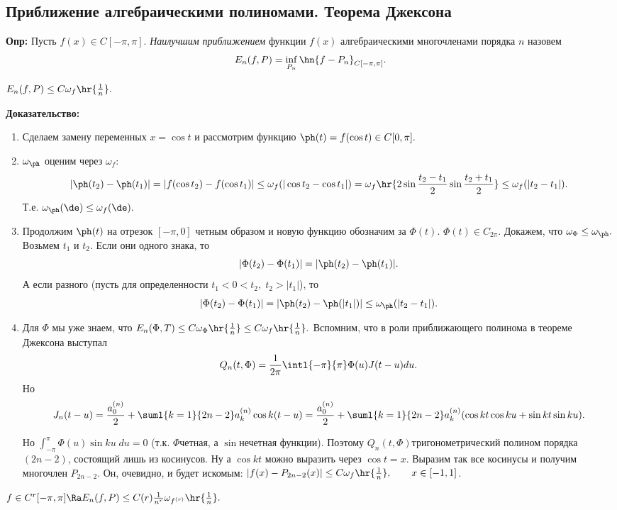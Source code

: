 \documentclass[a4paper]{article}
\begin{document}
\subsection{Приближение алгебраическими полиномами. Теорема Джексона}
\textbf{Опр:} Пусть $f(x)\in C[-\pi,\pi]$. \emph{Наилучшим
приближением} функции $f(x)$ алгебраическими многочленами порядка
$n$ назовем
$$E_n(f,P)=\inf_{P_n}\hn{f-P_n}_{C[-\pi,\pi]}.$$

\begin{theorems}[Джексон] $E_n(f,P)\le
C\omega_f\hr{\frac1n}.$
\end{theorems}
\textbf{Доказательство:}
\begin{enumerate}
\item
Сделаем замену переменных $x=\cos t$ и рассмотрим функцию
$\ph(t)=f(\cos t)\in C[0,\pi].$
\item
$\omega_{\ph}$ оценим через $\omega_f$:
\begin{equation*}
|\ph(t_2)-\ph(t_1)|=|f(\cos t_2)-f(\cos t_1)|\le\omega_f(|\cos
t_2-\cos
t_1|)=\omega_f\hr{2\sin\frac{t_2-t_1}2\sin\frac{t_2+t_1}2}\le\omega_f(|t_2-t_1|).
\end{equation*}
Т.е. $\omega_{\ph}(\de)\le\omega_f(\de).$
\item
Продолжим $\ph(t)$ на отрезок $[-\pi,0]$ четным образом и новую
функцию обозначим за $\Phi(t).$ $\Phi(t)\in C_{2\pi}$. Докажем,
что $\omega_{\Phi}\le\omega_{\ph}.$ Возьмем $t_1$ и $t_2$. Если
они одного знака, то
$$|\Phi(t_2)-\Phi(t_1)|=|\ph(t_2)-\ph(t_1)|.$$ А если разного
(пусть для определенности $t_1<0<t_2,\; t_2>|t_1|$), то
$$|\Phi(t_2)-\Phi(t_1)|=|\ph(t_2)-\ph(|t_1|)|\le\omega_{\ph}(|t_2-t_1|).$$
\item
Для $\Phi$ мы уже знаем, что $E_n(\Phi,T)\le
C\omega_{\Phi}\hr{\frac1n}\le
C\omega_f\hr{\frac1n}.$ Вспомним, что в роли приближающего
полинома в теореме Джексона выступал
\begin{equation*}
Q_n(t,\Phi)=\frac1{2\pi}\intl{-\pi}{\pi}\Phi(u)J(t-u)du.
\end{equation*}
Но
\begin{equation*}
J_n(t-u)=\frac{a_0^{(n)}}2+\suml{k=1}{2n-2} a_k^{(n)}\cos
k(t-u)=\frac{a_0^{(n)}}2+\suml{k=1}{2n-2} a_k^{(n)}(\cos
kt\cos ku+\sin kt\sin ku).
\end{equation*}

Но $\int_{-\pi}^{\pi}\Phi(u)\sin ku \;du=0$ (т.к. $\Phi$\т четная,
а $\sin$\т нечетная функции). Поэтому $Q_n(t,\Phi)$\т тригонометрический полином порядка $(2n-2)$, состоящий лишь из
косинусов. Ну а $\cos kt$ можно выразить через $\cos t=x$. Выразим
так все косинусы и получим многочлен $P_{2n-2}$. Он, очевидно, и
будет искомым: $|f(x)-P_{2n-2}(x)|\le
C\omega_f\hr{\frac1n},\qquad x\in[-1,1]$.
\end{enumerate}
\begin{theorems} 
$f\in C^r[-\pi,\pi]\Ra E_n(f,P)\le
C(r)\frac1{n^r}\omega_{f^{(r)}}\hr{\frac1n}.$
\end{theorems}
\end{document}
